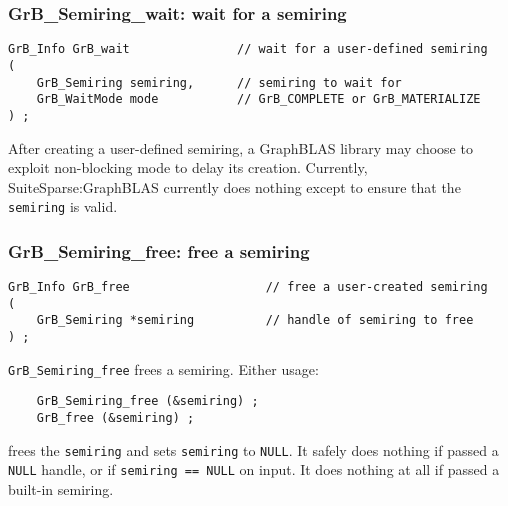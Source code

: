 \documentclass[12pt]{article}
\begin{document}
\subsubsection{{\sf GrB\_Semiring\_wait:} wait for a semiring}
\label{semiring_wait}

\begin{mdframed}[userdefinedwidth=6in]
{\footnotesize
\begin{verbatim}
GrB_Info GrB_wait               // wait for a user-defined semiring
(
    GrB_Semiring semiring,      // semiring to wait for
    GrB_WaitMode mode           // GrB_COMPLETE or GrB_MATERIALIZE
) ;
\end{verbatim}
}\end{mdframed}

After creating a user-defined semiring, a GraphBLAS library may choose to
exploit non-blocking mode to delay its creation.  Currently,
SuiteSparse:GraphBLAS currently does nothing except to ensure that the
\verb'semiring' is valid.

\subsubsection{{\sf GrB\_Semiring\_free:} free a semiring}
\label{semiring_free}

\begin{mdframed}[userdefinedwidth=6in]
{\footnotesize
\begin{verbatim}
GrB_Info GrB_free                   // free a user-created semiring
(
    GrB_Semiring *semiring          // handle of semiring to free
) ;
\end{verbatim}
} \end{mdframed}

\verb'GrB_Semiring_free' frees a semiring.  Either usage:

    {\small
    \begin{verbatim}
    GrB_Semiring_free (&semiring) ;
    GrB_free (&semiring) ; \end{verbatim}}

\noindent
frees the \verb'semiring' and sets \verb'semiring' to \verb'NULL'.  It safely
does nothing if passed a \verb'NULL' handle, or if \verb'semiring == NULL' on
input.  It does nothing at all if passed a built-in semiring.
\end{document}
